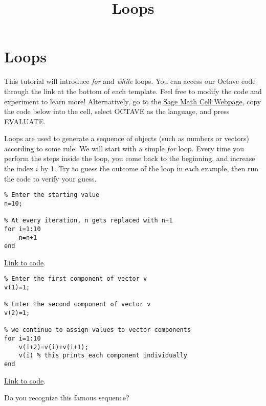 \documentclass{ximera}
\title{Loops} \license{CC BY-NC-SA 4.0}
\begin{document}
\begin{abstract}
\end{abstract}
\maketitle
\section*{Loops}

This tutorial will introduce \emph{for} and \emph{while} loops. You can access our Octave code through the link at the bottom of each template.  Feel free to modify the code and experiment to learn more!  Alternatively, go to the \href{https://sagecell.sagemath.org/}{Sage Math Cell Webpage}, copy the code below into the cell, select OCTAVE as the language, and press EVALUATE.  

Loops are used to generate a sequence of objects (such as numbers or vectors) according to some rule.  We will start with a simple \emph{for} loop.  Every time you perform the steps inside the loop, you come back to the beginning, and increase the index $i$ by 1.  Try to guess the outcome of the loop in each example, then run the code to verify your guess.

\begin{example}\label{ex:loop1}
        \begin{verbatim}
% Enter the starting value
n=10;

% At every iteration, n gets replaced with n+1
for i=1:10
    n=n+1
end
    \end{verbatim}

\href{https://sagecell.sagemath.org/?z=eJwdyjEOglAQRdF-ktnDa6iw4LeSX1i4kB95wiRkMMOIcfcSb3lyO9w9GciF2LNFms842vqmitcyjCoqHW4JHowv7Jxb2uYXOGbmjuBrbQ9O-Fgu8L6oPLeA1XItgwrOvP6ZPv0AoF8hKw==&lang=octave&interacts=eJyLjgUAARUAuQ==}{Link to code}.    
\end{example}

\begin{example}\label{ex:loop2}
    \begin{verbatim}
% Enter the first component of vector v
v(1)=1;

% Enter the second component of vector v
v(2)=1;

% we continue to assign values to vector components
for i=1:10
    v(i+2)=v(i)+v(i+1);
    v(i) % this prints each component individually
end
    \end{verbatim}

\href{https://sagecell.sagemath.org/?z=eJx1jjEKwzAMRXeD76AlEJOl7tiQsQcxttwIUjnYiktvXwdKmqVapC_pfX4HdxbMIDNCpFwEfHquiZEFUoSKXlKGqlXtrZnsqJVW3Ykp6BOH_9D1B72wvbEQbwiSwJVCD4bqlg3Lvvhih1XRKjZNk73Zi1bQqvY0NMfWzLDP1ozHwUDXElGBNVODAZ2fT7mIA1UKm1uWt1bI4QOvKk6t&lang=octave&interacts=eJyLjgUAARUAuQ==}{Link to code}.   

Do you recognize this famous sequence?
\end{example}
\end{document}
